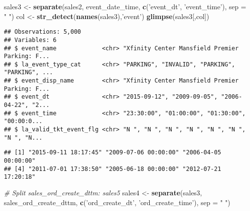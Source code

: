 \documentclass[]{article}
\newenvironment{Shaded}{\begin{snugshade}}{\end{snugshade}}
\newcommand{\CommentTok}[1]{\textcolor[rgb]{0.56,0.35,0.01}{\textit{#1}}}
\newcommand{\DataTypeTok}[1]{\textcolor[rgb]{0.13,0.29,0.53}{#1}}
\newcommand{\KeywordTok}[1]{\textcolor[rgb]{0.13,0.29,0.53}{\textbf{#1}}}
\newcommand{\NormalTok}[1]{#1}
\newcommand{\OperatorTok}[1]{\textcolor[rgb]{0.81,0.36,0.00}{\textbf{#1}}}
\newcommand{\StringTok}[1]{\textcolor[rgb]{0.31,0.60,0.02}{#1}}
\begin{document}
\begin{Shaded}
\begin{Highlighting}[]
\NormalTok{sales3 <-}\StringTok{ }\KeywordTok{separate}\NormalTok{(sales2, event_date_time, }\KeywordTok{c}\NormalTok{(}\StringTok{'event_dt'}\NormalTok{, }\StringTok{'event_time'}\NormalTok{), }\DataTypeTok{sep =} \StringTok{" "}\NormalTok{)}
\NormalTok{col <-}\StringTok{ }\KeywordTok{str_detect}\NormalTok{(}\KeywordTok{names}\NormalTok{(sales3),}\StringTok{'event'}\NormalTok{)}
\KeywordTok{glimpse}\NormalTok{(sales3[,col])}
\end{Highlighting}
\end{Shaded}

\begin{verbatim}
## Observations: 5,000
## Variables: 6
## $ event_name             <chr> "Xfinity Center Mansfield Premier Parking: F...
## $ la_event_type_cat      <chr> "PARKING", "INVALID", "PARKING", "PARKING", ...
## $ event_disp_name        <chr> "Xfinity Center Mansfield Premier Parking: F...
## $ event_dt               <chr> "2015-09-12", "2009-09-05", "2006-04-22", "2...
## $ event_time             <chr> "23:30:00", "01:00:00", "01:30:00", "00:00:0...
## $ la_valid_tkt_event_flg <chr> "N ", "N ", "N ", "N ", "N ", "N ", "N ", "N...
\end{verbatim}

\begin{Shaded}
\end{Shaded}

\begin{verbatim}
## [1] "2015-09-11 18:17:45" "2009-07-06 00:00:00" "2006-04-05 00:00:00"
## [4] "2011-07-01 17:38:50" "2005-06-18 00:00:00" "2012-07-21 17:20:18"
\end{verbatim}

\begin{Shaded}
\begin{Highlighting}[]
\CommentTok{# Split sales_ord_create_dttm: sales5}
\NormalTok{sales4 <-}\StringTok{ }\KeywordTok{separate}\NormalTok{(sales3, sales_ord_create_dttm, }\KeywordTok{c}\NormalTok{(}\StringTok{'ord_create_dt'}\NormalTok{, }\StringTok{'ord_create_time'}\NormalTok{), }\DataTypeTok{sep =} \StringTok{" "}\NormalTok{)}
\end{Highlighting}
\end{Shaded}
\end{document}

